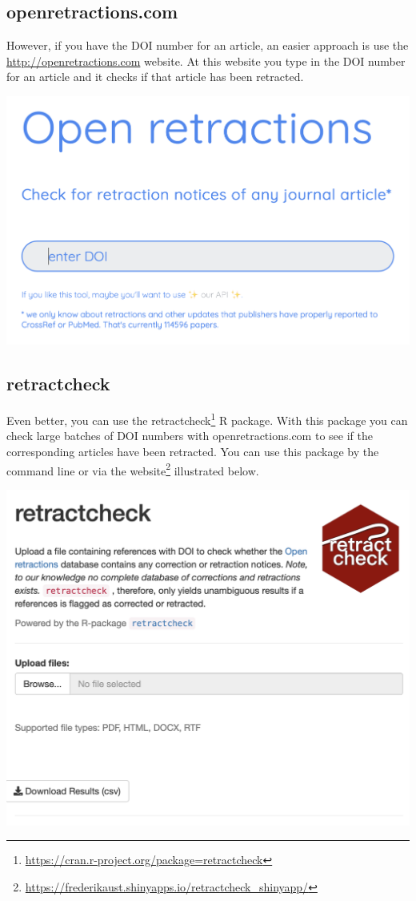 \documentclass[
]{krantz}
\renewcommand{\href}[2]{#2\footnote{\url{#1}}}
\begin{document}
\hypertarget{openretractions.com}{%
\subsection{openretractions.com}\label{openretractions.com}}

However, if you have the DOI number for an article, an easier approach is use the \url{http://openretractions.com} website. At this website you type in the DOI number for an article and it checks if that article has been retracted.

\includegraphics[width=0.6\linewidth]{ch_tools/images/openretractions}

\hypertarget{retractcheck}{%
\subsection{retractcheck}\label{retractcheck}}

Even better, you can use the \href{https://cran.r-project.org/package=retractcheck}{retractcheck} R package. With this package you can check large batches of DOI numbers with openretractions.com to see if the corresponding articles have been retracted. You can use this package by the command line or via the \href{https://frederikaust.shinyapps.io/retractcheck_shinyapp/}{website} illustrated below.

\includegraphics[width=0.6\linewidth]{ch_tools/images/retractcheck_website}

  

\backmatter
\printindex
\end{document}
